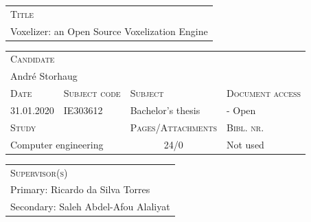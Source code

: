 \noindent
\begin{tabularx}{\textwidth}{ |X| }
	\hline
	\scshape{Title}\\
	Voxelizer: an Open Source Voxelization Engine\\
  	\hline 
\end{tabularx}
\vspace{1em}

\noindent
\begin{tabularx}{\textwidth}{ |l|l|X|X| }
	\hline
	\multicolumn{4}{|l|}{\scshape{Candidate}}\\
	\multicolumn{4}{|l|}{André Storhaug}\\
  	\hline
  	\scshape{Date} & \scshape{Subject code} & \scshape{Subject} & \scshape{Document access} \\
  	31.01.2020 & IE303612 & Bachelor's thesis & - Open \\
  	\hline
	\multicolumn{2}{|l|}{\scshape{Study}} & \scshape{Pages/Attachments} & \scshape{Bibl. nr.}\\
	\multicolumn{2}{|l|}{Computer engineering} & \multicolumn{1}{c|}{24/0} & Not used \\
  	\hline 
\end{tabularx}
\vspace{1em}

\noindent
\begin{tabularx}{\textwidth}{ |X| }
	\hline
	\scshape{Supervisor(s)}\\
	Primary: Ricardo da Silva Torres\\
	Secondary: Saleh Abdel-Afou Alaliyat\\
  	\hline 
\end{tabularx}

\noindent


\restoregeometry
